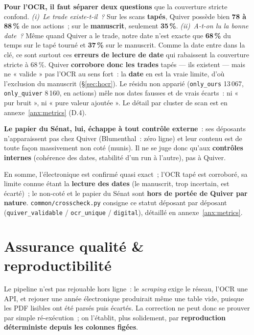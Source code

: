 \documentclass[11pt,a4paper]{article}
\newcommand{\co}[1]{\texttt{\small #1}}
\begin{document}
\textbf{Pour l'OCR, il faut séparer deux questions} que la couverture stricte confond. \emph{(i)~Le trade
existe-t-il~?} Sur les scans \textbf{tapés}, Quiver possède bien \textbf{78 à 88\,\%} de nos actions~; sur
le \textbf{manuscrit}, seulement \textbf{35\,\%}. \emph{(ii)~A-t-on lu la bonne date~?} Même quand Quiver a
le trade, notre date n'est exacte que \textbf{68\,\%} du temps sur le tapé tourné et \textbf{37\,\%} sur le
manuscrit. Comme la date entre dans la clé, ce sont surtout ces \textbf{erreurs de lecture de date} qui
rabaissent la couverture stricte à 68\,\%. Quiver \textbf{corrobore donc les trades} tapés — ils existent —
mais ne « valide » pas l'OCR au sens fort~: la \textbf{date} en est la vraie limite, d'où l'exclusion du
manuscrit (§\ref{sec:hocr}). Le résidu non apparié (\co{only_ours} 13\,067, \co{only_quiver} 8\,160, en
actions) mêle nos dates fausses et de vrais écarts~: ni « pur bruit », ni « pure valeur ajoutée ». Le détail
par cluster de scan est en annexe~\ref{anx:metrics} (D.4).

\textbf{Le papier du Sénat, lui, échappe à tout contrôle externe}~: ses déposants n'apparaissent pas chez
Quiver (Blumenthal~: zéro ligne) et leur contenu est de toute façon massivement non coté (munis). Il ne se
juge donc qu'aux \textbf{contrôles internes} (cohérence des dates, stabilité d'un run à l'autre), pas à
Quiver.

En somme, l'électronique est confirmé quasi exact~; l'OCR tapé est corroboré, sa limite connue étant la
\textbf{lecture des dates} (le manuscrit, trop incertain, est écarté)~; le non-coté et le papier du Sénat
sont \textbf{hors de portée de Quiver par nature}. \co{common/crosscheck.py} consigne ce statut déposant
par déposant (\co{quiver_validable} / \co{ocr_unique} / \co{digital}), détaillé en annexe~\ref{anx:metrics}.

\section{Assurance qualité \& reproductibilité}
\label{sec:repro}

Le pipeline n'est pas rejouable hors ligne~: le \emph{scraping} exige le réseau, l'OCR une API, et rejouer
une année électronique produirait même une table vide, puisque les PDF lisibles ont été parsés puis
écartés. La correction ne peut donc se prouver par simple ré-exécution~; on l'établit, plus solidement, par
\textbf{reproduction déterministe depuis les colonnes figées}.
\end{document}
